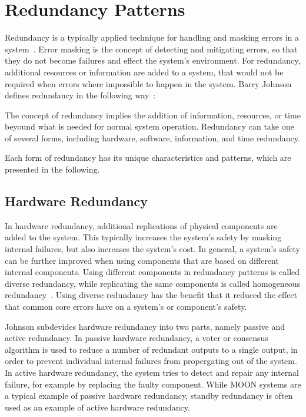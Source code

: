 \section{Redundancy Patterns}
\label{sec:redundancyPatterns}
Redundancy is a typically applied technique for handling and masking errors in a system~\cite{TanenbaumSteen07}.
Error masking is the concept of detecting and mitigating errors, so that they do not become failures and effect the system's environment.
For redundancy, additional resources or information are added to a system, that would not be required when errors where impossible to happen in the system.
Barry Johnson defines redundancy in the following way~\cite{BarryFaultToleranceAnalysis}:
\begin{definition}
The concept of redundancy implies the addition of information, resources, or time beyound what is needed for normal system operation.
Redundancy can take one of several forms, including hardware, software, information, and time redundancy.
\end{definition}

Each form of redundancy has its unique characteristics and patterns, which are presented in the following.

\subsection{Hardware Redundancy}
In hardware redundancy, additional replications of physical components are added to the system.
This typically increases the system's safety by masking internal failures, but also increases the system's cost.
In general, a system's safety can be further improved when using components that are based on different internal components.
Using different components in redundancy patterns is called diverse redundancy, while replicating the same components is called homogeneous redundancy~\cite{HomogeneousRedundancyOuzineb}.
Using diverse redundancy has the benefit that it reduced the effect that common core errors have on a system's or component's safety.

Johnson subdevides hardware redundancy into two parts, namely passive and active redundancy.
In passive hardware redundancy, a voter or consensus algorithm is used to reduce a number of redundant outputs to a single output, in order to prevent individual internal failures from propergating out of the system.
In active hardware redundancy, the system tries to detect and repair any internal failure, for example by replacing the faulty component.
While \gls*{MOON} systems are a typical example of passive hardware redundancy, standby redundancy is often used as an example of active hardware redundancy.

